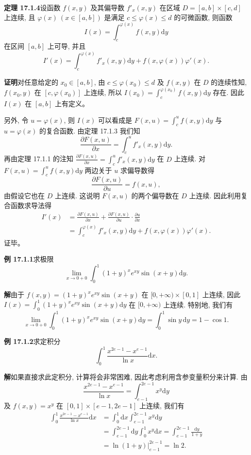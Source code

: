 \documentclass[UTF8,12pt,a4paper,fontset=fandol]{ctexart}
\begin{document}
\noindent\textbf{定理 17.1.4}\quad 设函数 $f(x,y)$ 及其偏导数 $f'_x(x,y)$ 在区域 $D=[a,b]\times[c,d]$ 上连续, 且 $\varphi(x)\ (x\in[a,b])$ 是满足 $c\leqslant \varphi(x)\leqslant d$ 的可微函数, 则函数
\[
  I(x)=\int_c^{\varphi(x)} f(x,y)\mathrm dy
\]
在区间 $[a,b]$ 上可导, 并且
\[
  I'(x)=\int_c^{\varphi(x)} f'_x(x,y)\mathrm dy
  + f(x,\varphi(x))\varphi'(x).
\]

\noindent\textbf{证明}\quad 对任意给定的 $x_0\in[a,b]$, 由 $c\leqslant\varphi(x_0)\leqslant d$ 及 $f(x,y)$ 在 $D$ 的连续性知, $f(x_0,y)$ 在 $[c,\varphi(x_0)]$ 上连续, 所以 $I(x_0)=\int_c^{\varphi(x_0)}f(x,y)\mathrm dy$ 存在. 因此 $I(x)$ 在 $[a,b]$ 上有定义。

另外, 令 $u=\varphi(x)$, 则 $I(x)$ 可以看成是 $F(x,u)=\int_c^u f(x,y)\mathrm dy$ 与 $u=\varphi(x)$ 的复合函数. 由定理 17.1.3 我们知
\[
  \frac{\partial F(x,u)}{\partial x}=\int_c^u f'_x(x,y)\mathrm dy.
\]
再由定理 17.1.1 的注知 $\frac{\partial F(x,u)}{\partial x}=\int_c^u f'_x(x,y)\mathrm dy$ 在 $D$ 上连续. 对 $F(x,u)=\int_c^u f(x,y)\mathrm dy$ 两边关于 $u$ 求偏导数得
\[
  \frac{\partial F(x,u)}{\partial u}=f(x,u),
\]
由假设它也在 $D$ 上连续. 这说明 $F(x,u)$ 的两个偏导数在 $D$ 上连续. 因此利用复合函数求导法得
\[
\begin{aligned}
  I'(x)
  &=\frac{\partial F(x,u)}{\partial x}
    +\frac{\partial F(x,u)}{\partial u}\cdot\frac{\partial u}{\partial x}\\
  &=\int_c^{\varphi(x)} f'_x(x,y)\mathrm dy
    +f(x,\varphi(x))\varphi'(x).
\end{aligned}
\]
证毕。

\noindent\textbf{例 17.1.1}\quad 求极限
\[
  \lim_{x\to0+0}\int_0^1 (1+y)^x e^{xy}\sin(x+y)\mathrm dy.
\]

\noindent\textbf{解}\quad 由于 $f(x,y)=(1+y)^x e^{xy}\sin(x+y)$ 在 $[0,+\infty)\times[0,1]$ 上连续, 因此 $I(x)=\int_0^1(1+y)^x e^{xy}\sin(x+y)\mathrm dy$ 在 $[0,+\infty)$ 上连续. 特别地, 我们有
\[
  \lim_{x\to0+0}\int_0^1 (1+y)^x e^{xy}\sin(x+y)\mathrm dy
  =\int_0^1 \sin y\,\mathrm dy
  =1-\cos1.
\]

\noindent\textbf{例 17.1.2}\quad 求定积分
\[
  \int_0^1 \frac{x^{2e-1}-x^{e-1}}{\ln x}\mathrm dx.
\]

\noindent\textbf{解}\quad 如果直接求此定积分, 计算将会非常困难, 因此考虑利用含参变量积分来计算. 由
\[
  \frac{x^{2e-1}-x^{e-1}}{\ln x}
  =
  \int_{e-1}^{2e-1} x^y\mathrm dy
\]
及 $f(x,y)=x^y$ 在 $[0,1]\times[e-1,2e-1]$ 上连续, 我们有
\[
\begin{aligned}
  \int_0^1 \frac{x^{2e-1}-x^{e-1}}{\ln x}\mathrm dx
  &=\int_0^1 \mathrm dx\int_{e-1}^{2e-1}x^y\mathrm dy\\
  &=\int_{e-1}^{2e-1}\mathrm dy\int_0^1x^y\mathrm dx
    =\int_{e-1}^{2e-1}\frac{\mathrm dy}{1+y}\\
  &=\left.\ln(1+y)\right|_{e-1}^{2e-1}=\ln2.
\end{aligned}
\]
\end{document}

